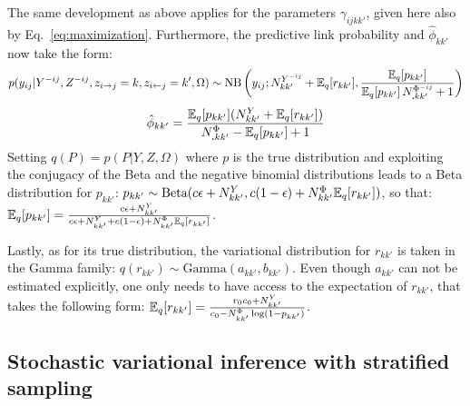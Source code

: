 The same development as above applies for the parameters $\gamma_{ijkk'}$, given here also by Eq.~\ref{eq:maximization}. Furthermore, the predictive link probability and $\hat \phi_{kk'}$ now take the form:
%
\[
p(y_{ij} | Y^{-ij}, Z^{- ij}, z_{i\rightarrow j}=k, z_{i\leftarrow j}=k',\Omega)  \sim \mathrm{NB}\left(y_{ij}; N^{Y^{-ij}}_{kk'} + \mathbb{E}_{q}[r_{kk'}], \frac{\mathbb{E}_{q}[p_{kk'}]}{\mathbb{E}_{q}[p_{kk'}]\,N^{\Phi^{-ij}}_{\bm{.}kk'} + 1} \right)
\]
\[
\hat \phi_{kk'} = \frac{\mathbb{E}_{q}[p_{kk'}](N^Y_{kk'} + \mathbb{E}_{q}[r_{kk'}])}{N^{\Phi}_{\bm{.}kk'} - \mathbb{E}_{q}[p_{kk'}] + 1}
\]
%
Setting $q(P) = p(P|Y,Z,\Omega)$ where $p$ is the true distribution and exploiting the conjugacy of the Beta and the negative binomial distributions leads to a Beta distribution for $p_{kk'}$: $p_{kk'} \sim \textrm{Beta}(c\epsilon + N^Y_{kk'}, c(1-\epsilon) + N^\Phi_{kk'}\mathbb{E}_{q}[r_{kk'}])$,
so that: $\mathbb{E}_{q}[p_{kk'}] = \frac{c\epsilon + N^Y_{kk'}}{c\epsilon + N^Y_{kk'} + c(1-\epsilon) + N^\Phi_{kk'}\mathbb{E}_{q}[r_{kk'}]}$.

Lastly, as for its true distribution, the variational distribution for $r_{kk'}$ is taken in the Gamma family:  $q(r_{kk'}) \sim \textrm{Gamma}(a_{kk'},b_{kk'})$. Even though $a_{kk'}$ can not be estimated explicitly, one only needs to have access to the expectation of $r_{kk'}$, that takes the following form: $\mathbb{E}_{q}[r_{kk'}] = \frac{r_0c_0+N^Y_{kk'}}{c_0  -N^\Phi_{kk'}\log(1-p_{kk'})}$.
%

\subsection{Stochastic variational inference with stratified sampling}

